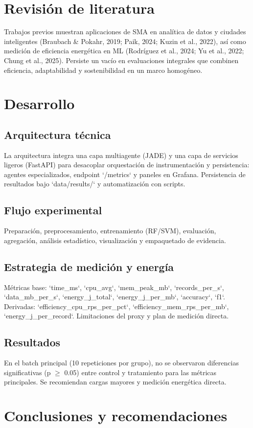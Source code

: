 \documentclass[12pt,oneside]{report}
\begin{document}
\chapter{Revisión de literatura}
Trabajos previos muestran aplicaciones de SMA en analítica de datos y ciudades inteligentes (Braubach \& Pokahr, 2019; Paik, 2024; Kuzin et al., 2022), así como medición de eficiencia energética en ML (Rodríguez et al., 2024; Yu et al., 2022; Chung et al., 2025). Persiste un vacío en evaluaciones integrales que combinen eficiencia, adaptabilidad y sostenibilidad en un marco homogéneo.

\chapter{Desarrollo}
\section{Arquitectura técnica}
La arquitectura integra una capa multiagente (JADE) y una capa de servicios ligeros (FastAPI) para desacoplar orquestación de instrumentación y persistencia: agentes especializados, endpoint `/metrics` y paneles en Grafana. Persistencia de resultados bajo `data/results/` y automatización con scripts.
\section{Flujo experimental}
Preparación, preprocesamiento, entrenamiento (RF/SVM), evaluación, agregación, análisis estadístico, visualización y empaquetado de evidencia.
\section{Estrategia de medición y energía}
Métricas base: `time_ms`, `cpu_avg`, `mem_peak_mb`, `records_per_s`, `data_mb_per_s`, `energy_j_total`, `energy_j_per_mb`, `accuracy`, `f1`. Derivadas: `efficiency_cpu_rps_per_pct`, `efficiency_mem_rps_per_mb`, `energy_j_per_record`. Limitaciones del proxy y plan de medición directa.
\section{Resultados}
En el batch principal (10 repeticiones por grupo), no se observaron diferencias significativas (p $\ge$ 0.05) entre control y tratamiento para las métricas principales. Se recomiendan cargas mayores y medición energética directa.

\chapter{Conclusiones y recomendaciones}
\end{document}
